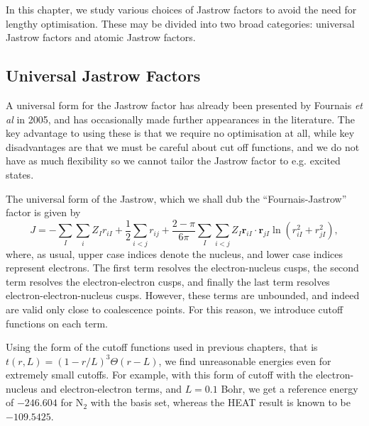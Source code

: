 In this chapter, we study various choices of Jastrow factors to avoid the need for lengthy optimisation. These may be divided into two broad categories: universal Jastrow factors and atomic Jastrow factors.

\subsection{Universal Jastrow Factors}

A universal form for the Jastrow factor has already been presented by Fournais \emph{et al} in 2005,\supercite{fournaisSharp2005} and has occasionally made further appearances in the literature.\supercite{tewSecond2008,szenesStriking2024} The key advantage to using these is that we require no optimisation at all, while key disadvantages are that we must be careful about cut off functions, and we do not have as much flexibility so we cannot tailor the Jastrow factor to e.g. excited states.

The universal form of the Jastrow, which we shall dub the ``Fournais-Jastrow'' factor is given by\supercite{fournaisSharp2005,fournaisNonIsotropic2007}
\begin{equation}
    \label{eq:fournais-full}
    J = -\sum_I\sum_i Z_Ir_{iI} + \frac 12\sum_{i<j}r_{ij} + \frac{2-\pi}{6\pi}\sum_I\sum_{i<j}Z_I\bm r_{iI}\cdot \bm r_{jI}\ln(r_{iI}^2+r_{jI}^2),
\end{equation}
where, as usual, upper case indices denote the nucleus, and lower case indices represent electrons. The first term resolves the electron-nucleus cusps, the second term resolves the electron-electron cusps, and finally the last term resolves electron-electron-nucleus cusps. However, these terms are unbounded, and indeed are valid only close to coalescence points. For this reason, we introduce cutoff functions on each term.

Using the form of the cutoff functions used in previous chapters, that is $t(r,L) = (1-r/L)^3\Theta(r-L)$, we find unreasonable energies even for extremely small cutoffs. For example, with this form of cutoff with the electron-nucleus and electron-electron terms, and $L=0.1$ Bohr, we get a reference energy of $-246.604$ for N$_2$ with the \avtz basis set, whereas the \gls{HEAT} result is known to be $-109.5425$.\supercite{fellerSurvey2008}

